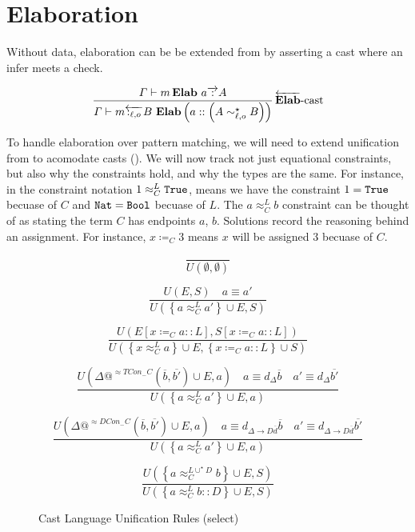\section{Elaboration}
Without data, elaboration can be be extended from  by asserting a cast where an infer meets a check.

\[
\frac{\varGamma\vdash m\,\textbf{Elab}\ a\overrightarrow{\,:\,}A}{\varGamma\vdash m\overleftarrow{\,:_{\ell,o}\,}B\ \textbf{Elab}\left(a::\left(A\sim_{\ell,o}^{\star}B\right)\right)}
\rulename{\overleftarrow{\textbf{Elab}}-cast}
\]


To handle elaboration over pattern matching, we will need to extend unification from  to acomodate casts ().
We will now track not just equational constraints, but also why the constraints hold, and why the types are the same.
For instance, in the constraint notation $1 \approx_{C}^{L} \mathtt{True}{}$, means we have the constraint $1 = \mathtt{True}{}$ becuase of $C$ and $\mathtt{Nat}{} = \mathtt{Bool}{}$ becuase of $L$. 
The $a \approx_{C}^{L} b$ constraint can be thought of as stating the term $C$ has endpoints $a$, $b$.
Solutions record the reasoning behind an assignment.
For instance, $x\coloneqq_{C} 3$ means $x$ will be assigned $3$ becuase of $C$.

\begin{figure}
\[
\frac{\,}{U\left(\emptyset,\emptyset\right)}
\]

\[
\frac{
  U\left(E,S\right)\quad a\equiv a'
}{
  U\left(\left\{ a \approx_{C}^{L} a' \right\} \cup E,S\right)
}
\]

\[
\frac{
  U\left(E\left[x\coloneqq_{C} a :: L\right],S\left[x\coloneqq_{C} a :: L\right]\right)
}{
  U\left(\left\{ x \approx_{C}^{L} a\right\} \cup E,\left\{x\coloneqq_{C} a :: L\right\} \cup S \right) 
}
\]

\[
\frac{
  U\left(\Delta @^{\approx TCon_{-}C}( \overline{b},\overline{b'} ) \cup E,a\right)\quad
  a\equiv d_{\Delta}\overline{b}
  \quad   a' \equiv d_{\Delta}\overline{b'}
}{U\left(\left\{ a \approx_{C}^{L} a'\right\} \cup E,a\right)}
\]

\[
\frac{
  U\left(\Delta @^{\approx DCon_{-}C}( \overline{b},\overline{b'} ) \cup E,a\right)\quad
  a\equiv d_{\Delta\rightarrow D\overline{d}}\overline{b}
  \quad   a' \equiv d_{\Delta\rightarrow D\overline{d}}\overline{b'}
}{U\left(\left\{ a \approx_{C}^{L} a'\right\} \cup E,a\right)}
\]

\[
\frac{
  U\left( \left\{ a \approx_{C}^{L\cup^{\star}D} b \right\}\cup E, S \right)
}{
  U\left(\left\{ a \approx_{C}^{L} b::D \right\} \cup E, S \right) 
}
\]

\caption{Cast Language Unification Rules (select)}
\label{fig:cast-data-unification}
\end{figure}

